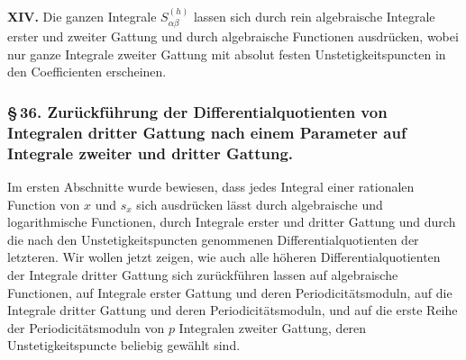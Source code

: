 \documentclass[10pt]{article}
\begin{document}
\noindent\textbf{XIV.} Die ganzen Integrale \(S_{\alpha\beta}^{(h)}\) lassen sich durch rein algebraische Integrale erster und zweiter Gattung und durch algebraische Functionen ausdrücken, wobei nur ganze Integrale zweiter Gattung mit absolut festen Unstetigkeitspuncten in den Coefficienten erscheinen.

\subsubsection*{\S\,36. Zurückführung der Differentialquotienten von Integralen dritter Gattung nach einem Parameter auf Integrale zweiter und dritter Gattung.}

Im ersten Abschnitte wurde bewiesen, dass jedes Integral einer rationalen Function von \(x\) und \(s_x\) sich ausdrücken lässt durch algebraische und logarithmische Functionen, durch Integrale erster und dritter Gattung und durch die nach den Unstetigkeitspuncten genommenen Differentialquotienten der letzteren. Wir wollen jetzt zeigen, wie auch alle höheren Differentialquotienten der Integrale dritter Gattung sich zurückführen lassen auf algebraische Functionen, auf Integrale erster Gattung und deren Periodicitätsmoduln, auf die Integrale dritter Gattung und deren Periodicitätsmoduln, und auf die erste Reihe der Periodicitätsmoduln von \(p\) Integralen zweiter Gattung, deren Unstetigkeitspuncte beliebig gewählt sind.
\end{document}
